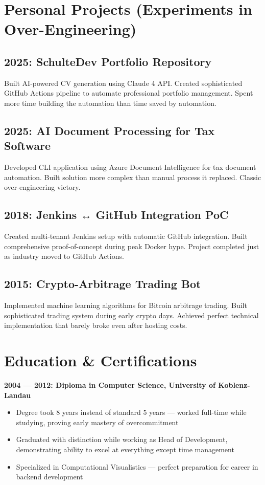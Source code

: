 \documentclass[11pt,a4paper]{article}
\begin{document}
\section*{Personal Projects (Experiments in Over-Engineering)}

\subsection*{2025: SchulteDev Portfolio Repository}
Built AI-powered CV generation using Claude 4 API. Created sophisticated GitHub Actions pipeline to automate professional portfolio management. Spent more time building the automation than time saved by automation.

\subsection*{2025: AI Document Processing for Tax Software}
Developed CLI application using Azure Document Intelligence for tax document automation. Built solution more complex than manual process it replaced. Classic over-engineering victory.

\subsection*{2018: Jenkins ↔ GitHub Integration PoC}
Created multi-tenant Jenkins setup with automatic GitHub integration. Built comprehensive proof-of-concept during peak Docker hype. Project completed just as industry moved to GitHub Actions.

\subsection*{2015: Crypto-Arbitrage Trading Bot}
Implemented machine learning algorithms for Bitcoin arbitrage trading. Built sophisticated trading system during early crypto days. Achieved perfect technical implementation that barely broke even after hosting costs.

\section*{Education \& Certifications}

\textbf{2004 — 2012: Diploma in Computer Science, University of Koblenz-Landau}
\begin{itemize}[leftmargin=1.5em,itemsep=0.2em]
\item Degree took 8 years instead of standard 5 years — worked full-time while studying, proving early mastery of overcommitment
\item Graduated with distinction while working as Head of Development, demonstrating ability to excel at everything except time management
\item Specialized in Computational Visualistics — perfect preparation for career in backend development
\end{itemize}
\end{document}
